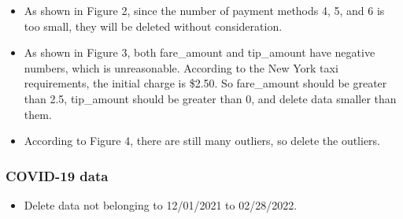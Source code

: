 \documentclass[11pt]{article}
\begin{document}
\begin{itemize}
    \item As shown in Figure 2, since the number of payment methods 4, 5, and 6 is too small, they will be deleted without consideration.
\end{itemize}
\begin{itemize}
    \item As shown in Figure 3, both fare\_amount and tip\_amount have negative numbers, which is unreasonable. According to the New York taxi requirements, the initial charge is \$2.50. So fare\_amount should be greater than 2.5, tip\_amount should be greater than 0, and delete data smaller than them.
\end{itemize}
\begin{itemize}
    \item According to Figure 4, there are still many outliers, so delete the outliers.
\end{itemize}
\subsubsection{COVID-19 data}
\begin{itemize}
    \item Delete data not belonging to 12/01/2021 to 02/28/2022.
\end{itemize}
\end{document}
